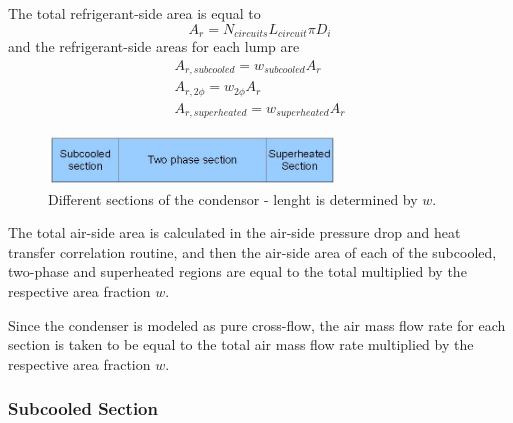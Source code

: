 \documentclass[]{article}
\begin{document}
The total refrigerant-side area is equal to
\begin{equation}
A_r=N_{circuits}L_{circuit}\pi D_i
\end{equation} 
and the refrigerant-side areas for each lump are
\begin{equation}
\begin{array}{c}
A_{r,subcooled}=w_{subcooled}A_r\\
A_{r,2\phi}=w_{2\phi}A_r\\
A_{r,superheated}=w_{superheated}A_r
\end{array}
\end{equation}

  \begin{figure}
  \centerline{
    \mbox{\includegraphics[width=3.00in]{condensorsections.jpg}}
  }
  \caption{Different sections of the condensor - lenght is determined by $w$.}
  \label{overView}
  \end{figure}


The total air-side area is calculated in the air-side pressure drop and heat transfer correlation routine, and then the air-side area of each of the subcooled, two-phase and superheated regions are equal to the total multiplied by the respective area fraction $w$.

Since the condenser is modeled as pure cross-flow, the air mass flow rate for each section is taken to be equal to the total air mass flow rate multiplied by the respective area fraction $w$.

\subsubsection{Subcooled Section}
\end{document}
